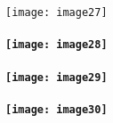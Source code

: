 \documentclass{book} %
\begin{document}
\noindent 

\noindent 

\noindent \texttt{[image: image27]}

\noindent 
\paragraph{}

\noindent 
\paragraph{}

\noindent 
\paragraph{\texttt{[image: image28]}}

\noindent 
\paragraph{\texttt{[image: image29]}  }

\noindent 
\paragraph{}


\paragraph{   \texttt{[image: image30]}}

\noindent 
\paragraph{}


\paragraph{}


\paragraph{}


\paragraph{}


\paragraph{}
\end{document}
